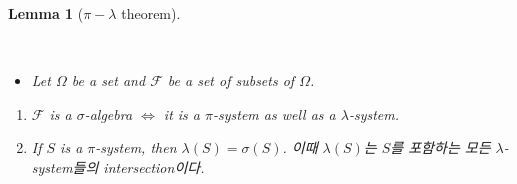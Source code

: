 \documentclass[
  13pt,
  letterpaper,
  DIV=11,
  numbers=noendperiod]{scrreprt}
\providecommand{\tightlist}{%
  \setlength{\itemsep}{0pt}\setlength{\parskip}{0pt}}\usepackage{longtable,booktabs,array}
\theoremstyle{plain}
\theoremstyle{definition}
\theoremstyle{definition}
\theoremstyle{plain}
\newtheorem{lemma}{Lemma}[chapter]
\theoremstyle{definition}
\theoremstyle{plain}
\theoremstyle{remark}
\begin{document}
\begin{lemma}[\(\pi-\lambda\)
theorem]\protect\hypertarget{lem-pilambdathm}{}\label{lem-pilambdathm}

~

\begin{itemize}
\tightlist
\item
  Let \(\Omega\) be a set and \(\mathcal{F}\) be a set of subsets of
  \(\Omega\).
\end{itemize}

\begin{enumerate}
\def\labelenumi{\arabic{enumi}.}
\item
  \(\mathcal{F}\) is a \(\sigma\)-algebra \(\Longleftrightarrow\) it is
  a \(\pi\)-system as well as a \(\lambda\)-system.
\item
  If \(S\) is a \(\pi\)-system, then \(\lambda (S) = \sigma(S)\). 이때
  \(\lambda (S)\)는 \(S\)를 포함하는 모든 \(\lambda\)-system들의
  intersection이다.
\end{enumerate}

\end{lemma}
\end{document}
